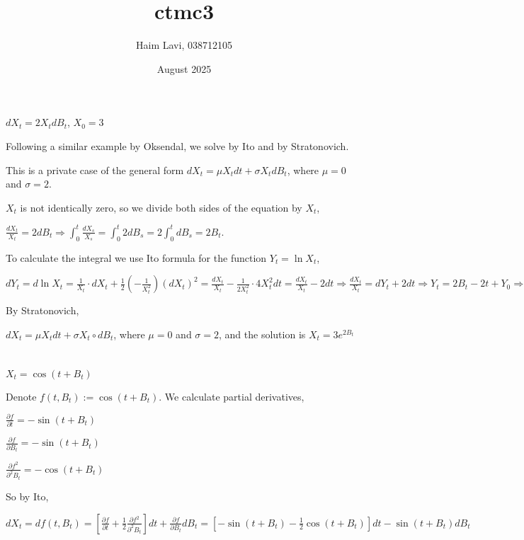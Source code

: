 \documentclass{article}
\title{ctmc3}
\author{Haim Lavi, 038712105}
\date{August 2025}
\begin{document}
\maketitle

\section{}
$dX_t=2X_tdB_t$, $X_0=3$

Following a similar example by Oksendal, we solve by Ito and by Stratonovich.

This is a private case of the general form $dX_t=\mu{X_t}dt+\sigma{X_t}dB_t$, where $\mu=0$ and $\sigma=2$.

$X_t$ is not identically zero, so we divide both sides of the equation by $X_t$,

$\frac{dX_t}{X_t}=2dB_t\Rightarrow\int_0^t\frac{dX_s}{X_s}=\int_0^t{2dB_s}=2\int_0^t{dB_s}=2B_t$.

To calculate the integral we use Ito formula for the function $Y_t=\ln{X_t}$, 

$dY_t=d\ln{X_t}=\frac{1}{X_t}\cdot{dX_t}+\frac{1}{2}(-\frac{1}{X_t^2})(dX_t)^2=\frac{dX_t}{X_t}-\frac{1}{2X_t^2}\cdot{4}X_t^2dt=\frac{dX_t}{X_t}-2dt\Rightarrow\frac{dX_t}{X_t}=dY_t+2dt\Rightarrow{Y_t=2B_t-2t+Y_0}\Rightarrow{\ln{X_t}-\ln_{}X_0}=2B_t-2t\Rightarrow\ln\frac{X_t}{X_0}=2B_t-2t\Rightarrow\frac{X_t}{X_0}=e^{2B_t-2t}\Rightarrow{X_t=3e^{2B_t-2t}}$

By Stratonovich,

$dX_t=\mu{X_t}dt+\sigma{X_t}\circ{dB_t}$, where $\mu=0$ and $\sigma=2$, and the solution is $X_t=3e^{2B_t}$
\section{}
$X_t=\cos(t+B_t)$

Denote $f(t,B_t):=\cos(t+B_t)$. We calculate partial derivatives,

$\frac{\partial{f}}{\partial{t}}=-\sin(t+B_t)$

$\frac{\partial{f}}{\partial{B_t}}=-\sin(t+B_t)$

$\frac{\partial{f}^2}{\partial^2{B_t}}=-\cos(t+B_t)$

So by Ito,

$dX_t=df(t,B_t)=[\frac{\partial{f}}{\partial{t}}+\frac{1}{2}\frac{\partial{f}^2}{\partial^2{B_t}}]dt+\frac{\partial{f}}{\partial{B_t}}dB_t=[-\sin(t+B_t)-\frac{1}{2}\cos(t+B_t)]dt-\sin(t+B_t)dB_t$
\end{document}
